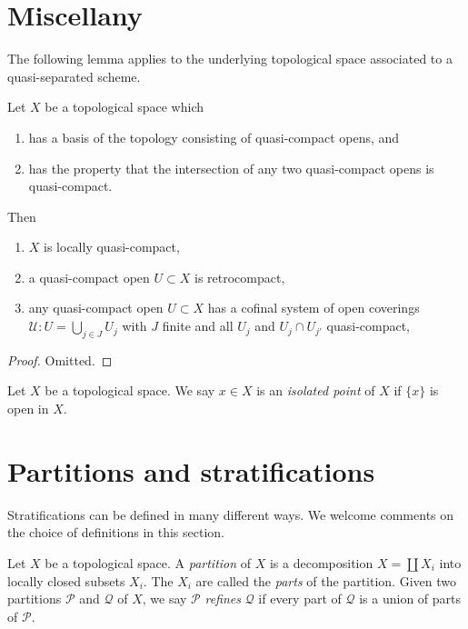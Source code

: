 \section{Miscellany}
\label{section-miscellany}


\noindent
The following lemma applies to the underlying topological space
associated to a quasi-separated scheme.

\begin{lemma}
\label{lemma-topology-quasi-separated-scheme}
Let $X$ be a topological space which
\begin{enumerate}
\item has a basis of the topology consisting of quasi-compact opens, and
\item has the property that the intersection of any two quasi-compact
opens is quasi-compact.
\end{enumerate}
Then
\begin{enumerate}
\item $X$ is locally quasi-compact,
\item a quasi-compact open $U \subset X$ is retrocompact,
\item any quasi-compact open $U \subset X$ has a cofinal system of open
coverings $\mathcal{U} : U = \bigcup_{j\in J} U_j$ with $J$ finite
and all $U_j$ and $U_j \cap U_{j'}$ quasi-compact,
\end{enumerate}
\end{lemma}

\begin{proof}
Omitted.
\end{proof}

\begin{definition}
\label{definition-isolated-point}
Let $X$ be a topological space. We say $x \in X$ is an
{\it isolated point} of $X$ if $\{x\}$ is open in $X$.
\end{definition}



\section{Partitions and stratifications}
\label{section-stratifications}

\noindent
Stratifications can be defined in many different ways. We welcome
comments on the choice of definitions in this section.

\begin{definition}
\label{definition-paritition}
Let $X$ be a topological space. A {\it partition} of $X$ is a
decomposition $X = \coprod X_i$ into locally closed subsets $X_i$.
The $X_i$ are called the {\it parts} of the partition.
Given two partitions $\mathcal{P}$ and $\mathcal{Q}$ of $X$, we say
$\mathcal{P}$ {\it refines} $\mathcal{Q}$ if every part of $\mathcal{Q}$
is a union of parts of $\mathcal{P}$.
\end{definition}

